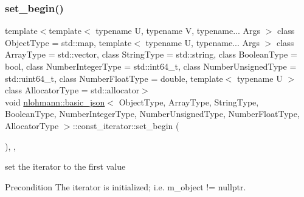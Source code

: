 \subsubsection{\texorpdfstring{set\+\_\+begin()}{set\_begin()}}
{\footnotesize\ttfamily template$<$template$<$ typename U, typename V, typename... Args $>$ class Object\+Type = std\+::map, template$<$ typename U, typename... Args $>$ class Array\+Type = std\+::vector, class String\+Type  = std\+::string, class Boolean\+Type  = bool, class Number\+Integer\+Type  = std\+::int64\+\_\+t, class Number\+Unsigned\+Type  = std\+::uint64\+\_\+t, class Number\+Float\+Type  = double, template$<$ typename U $>$ class Allocator\+Type = std\+::allocator$>$ \\
void \hyperlink{classnlohmann_1_1basic__json}{nlohmann\+::basic\+\_\+json}$<$ Object\+Type, Array\+Type, String\+Type, Boolean\+Type, Number\+Integer\+Type, Number\+Unsigned\+Type, Number\+Float\+Type, Allocator\+Type $>$\+::const\+\_\+iterator\+::set\+\_\+begin (\begin{DoxyParamCaption}{ }\end{DoxyParamCaption})\hspace{0.3cm}{\ttfamily [inline]}, {\ttfamily [private]}, {\ttfamily [noexcept]}}



set the iterator to the first value 

\begin{DoxyPrecond}{Precondition}
The iterator is initialized; i.\+e. {\ttfamily m\+\_\+object != nullptr}. 
\end{DoxyPrecond}
\hypertarget{classnlohmann_1_1basic__json_1_1const__iterator_a149e876bd288ceb1536e27a7f8b3b8fd}{}\label{classnlohmann_1_1basic__json_1_1const__iterator_a149e876bd288ceb1536e27a7f8b3b8fd} 
